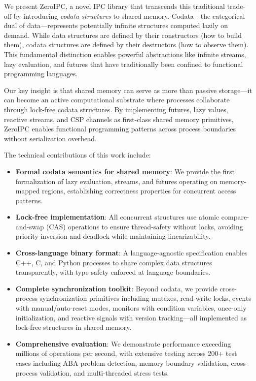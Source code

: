 \documentclass[10pt,conference]{IEEEtran}
\begin{document}
We present ZeroIPC, a novel IPC library that transcends this traditional trade-off by introducing \emph{codata structures} to shared memory. Codata---the categorical dual of data---represents potentially infinite structures computed lazily on demand. While data structures are defined by their constructors (how to build them), codata structures are defined by their destructors (how to observe them). This fundamental distinction enables powerful abstractions like infinite streams, lazy evaluation, and futures that have traditionally been confined to functional programming languages.

Our key insight is that shared memory can serve as more than passive storage---it can become an active computational substrate where processes collaborate through lock-free codata structures. By implementing futures, lazy values, reactive streams, and CSP channels as first-class shared memory primitives, ZeroIPC enables functional programming patterns across process boundaries without serialization overhead.

The technical contributions of this work include:

\begin{itemize}
\item \textbf{Formal codata semantics for shared memory}: We provide the first formalization of lazy evaluation, streams, and futures operating on memory-mapped regions, establishing correctness properties for concurrent access patterns.

\item \textbf{Lock-free implementation}: All concurrent structures use atomic compare-and-swap (CAS) operations to ensure thread-safety without locks, avoiding priority inversion and deadlock while maintaining linearizability.

\item \textbf{Cross-language binary format}: A language-agnostic specification enables C++, C, and Python processes to share complex data structures transparently, with type safety enforced at language boundaries.

\item \textbf{Complete synchronization toolkit}: Beyond codata, we provide cross-process synchronization primitives including mutexes, read-write locks, events with manual/auto-reset modes, monitors with condition variables, once-only initialization, and reactive signals with version tracking---all implemented as lock-free structures in shared memory.

\item \textbf{Comprehensive evaluation}: We demonstrate performance exceeding millions of operations per second, with extensive testing across 200+ test cases including ABA problem detection, memory boundary validation, cross-process validation, and multi-threaded stress tests.
\end{itemize}
\end{document}
